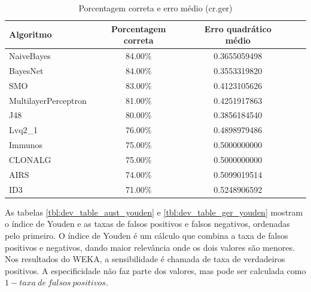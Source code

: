 \begin{table}[h!]
    \vspace{0.5cm}
    \centering
    \caption{Porcentagem correta e erro médio (cr.ger)}
    \label{tbl:dev_table_ger_correct}
    \vspace{0.5cm}
    \begin{tabular}{|l|c|c|c|c|}
        \hline
        \textbf{Algoritmo} & \textbf{Porcentagem correta} & \textbf{Erro quadrático médio} \\
        \hline
        \rowcolor[gray]{.9}
        NaiveBayes           & 84.00\% & 0.3655059498 \\ \hline
        \rowcolor[gray]{.9}
        BayesNet             & 84.00\% & 0.3553319820 \\ \hline
        \rowcolor[gray]{.9}
        SMO                  & 83.00\% & 0.4123105626 \\ \hline
        MultilayerPerceptron & 81.00\% & 0.4251917863 \\ \hline
        J48                  & 80.00\% & 0.3856184540 \\ \hline
        Lvq2\_1              & 76.00\% & 0.4898979486 \\ \hline
        Immunos              & 75.00\% & 0.5000000000 \\ \hline
        CLONALG              & 75.00\% & 0.5000000000 \\ \hline
        AIRS                 & 74.00\% & 0.5099019514 \\ \hline
        ID3                  & 71.00\% & 0.5248906592 \\ \hline
    \end{tabular}
    \vspace{0.5cm}
\end{table}

As tabelas \ref{tbl:dev_table_aust_youden} e \ref{tbl:dev_table_ger_youden} mostram o índice de Youden e as taxas de falsos positivos e falsos negativos, ordenadas pelo primeiro. O índice de Youden é um cálculo que combina a taxa de falsos positivos e negativos, dando maior relevância onde os dois valores são menores. Nos resultados do WEKA, a sensibilidade é chamada de taxa de verdadeiros positivos. A especificidade não faz parte dos valores, mas pode ser calculada como $1 - taxa\ de\ falsos\ positivos$.

